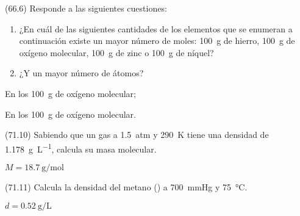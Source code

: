     \begin{exercise}[
        tags    = {},
        topics  = {química,química básica},
        source  = {FQ 1B MGH 2016, p66, e6},
      ]
      (66.6) Responde a las siguientes cuestiones:
      \begin{enumerate}
        \item ¿En cuál de las siguientes cantidades de los elementos que se enumeran a continuación existe un mayor número de moles: \SI{100}{\gram} de hierro, \SI{100}{\gram} de oxígeno molecular, \SI{100}{\gram} de zinc o \SI{100}{\gram} de níquel?
        \item ¿Y un mayor número de átomos?
      \end{enumerate}
    \end{exercise}

    \begin{solution}
      \begin{enumerate*}
        \item En los \SI{100}{\gram} de oxígeno molecular;
        \item En los \SI{100}{\gram} de oxígeno molecular.
      \end{enumerate*}
    \end{solution}




    \begin{exercise}[
        tags    = {},
        topics  = {química,química básica},
        source  = {FQ 1B MGH 2016, p71, e10},
      ]
      (71.10) Sabiendo que un gas a \SI{1,5}{atm} y \SI{290}{\kelvin} tiene una densidad de \SI{1,178}{\gram\per\liter}, calcula su masa molecular.
    \end{exercise}

    \begin{solution}
      \( M = \SI{18,7}{\gram\per\mole} \)
    \end{solution}




    \begin{exercise}[
        tags    = {},
        topics  = {química,química básica},
        source  = {FQ 1B MGH 2016, p71, e11},
      ]
      (71.11) Calcula la densidad del metano () a \SI{700}{\mmHg} y \SI{75}{\celsius}.
    \end{exercise}

    \begin{solution}
      \( d = \SI{0,52}{\gram\per\liter} \)
    \end{solution}



